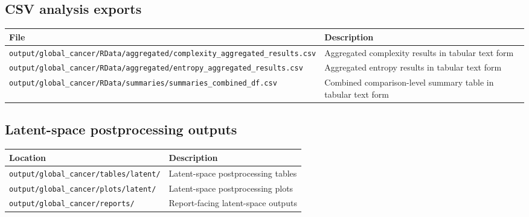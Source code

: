\documentclass[
  letterpaper,
  DIV=11,
  numbers=noendperiod,
  openany,
  oneside]{scrreprt}
\begin{document}
\subsection*{CSV analysis exports}\label{csv-analysis-exports}

\begin{longtable}[]{@{}
  >{\raggedright\arraybackslash}p{}
  >{\raggedright\arraybackslash}p{}@{}}
\toprule\noalign{}
\begin{minipage}[b]{\linewidth}\raggedright
File
\end{minipage} & \begin{minipage}[b]{\linewidth}\raggedright
Description
\end{minipage} \\
\midrule\noalign{}
\endhead
\bottomrule\noalign{}
\endlastfoot
\texttt{output/global\_cancer/RData/aggregated/complexity\_aggregated\_results.csv}
& Aggregated complexity results in tabular text form \\
\texttt{output/global\_cancer/RData/aggregated/entropy\_aggregated\_results.csv}
& Aggregated entropy results in tabular text form \\
\texttt{output/global\_cancer/RData/summaries/summaries\_combined\_df.csv}
& Combined comparison-level summary table in tabular text form \\
\end{longtable}

\subsection*{Latent-space postprocessing
outputs}\label{latent-space-postprocessing-outputs}

\begin{longtable}[]{@{}
  >{\raggedright\arraybackslash}p{}
  >{\raggedright\arraybackslash}p{}@{}}
\toprule\noalign{}
\begin{minipage}[b]{\linewidth}\raggedright
Location
\end{minipage} & \begin{minipage}[b]{\linewidth}\raggedright
Description
\end{minipage} \\
\midrule\noalign{}
\endhead
\bottomrule\noalign{}
\endlastfoot
\texttt{output/global\_cancer/tables/latent/} & Latent-space
postprocessing tables \\
\texttt{output/global\_cancer/plots/latent/} & Latent-space
postprocessing plots \\
\texttt{output/global\_cancer/reports/} & Report-facing latent-space
outputs \\
\end{longtable}
\end{document}
